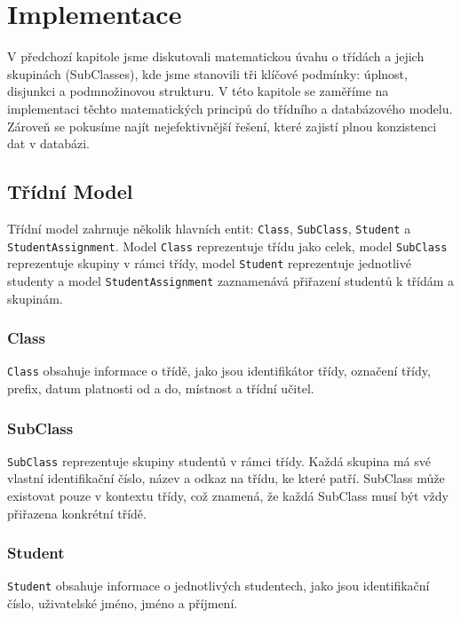 \section{Implementace}
V předchozí kapitole jsme diskutovali matematickou úvahu o třídách a jejich skupinách (SubClasses), kde jsme stanovili tři klíčové podmínky: úplnost, disjunkci a podmnožinovou strukturu. V této kapitole se zaměříme na implementaci těchto matematických principů do třídního a databázového modelu. Zároveň se pokusíme najít nejefektivnější řešení, které zajistí plnou konzistenci dat v databázi.

\subsection*{Třídní Model}

Třídní model zahrnuje několik hlavních entit: \texttt{Class}, \texttt{SubClass}, \texttt{Student} a \texttt{StudentAssignment}. Model \texttt{Class} reprezentuje třídu jako celek, model \texttt{SubClass} reprezentuje skupiny v rámci třídy, model \texttt{Student} reprezentuje jednotlivé studenty a model \texttt{StudentAssignment} zaznamenává přiřazení studentů k třídám a skupinám.

\subsubsection*{Class}

\texttt{Class} obsahuje informace o třídě, jako jsou identifikátor třídy, označení třídy, prefix, datum platnosti od a do, místnost a třídní učitel. 

\subsubsection*{SubClass}

\texttt{SubClass} reprezentuje skupiny studentů v rámci třídy. Každá skupina má své vlastní identifikační číslo, název a odkaz na třídu, ke které patří. SubClass může existovat pouze v kontextu třídy, což znamená, že každá SubClass musí být vždy přiřazena konkrétní třídě.

\subsubsection*{Student}

\texttt{Student} obsahuje informace o jednotlivých studentech, jako jsou identifikační číslo, uživatelské jméno, jméno a příjmení.

